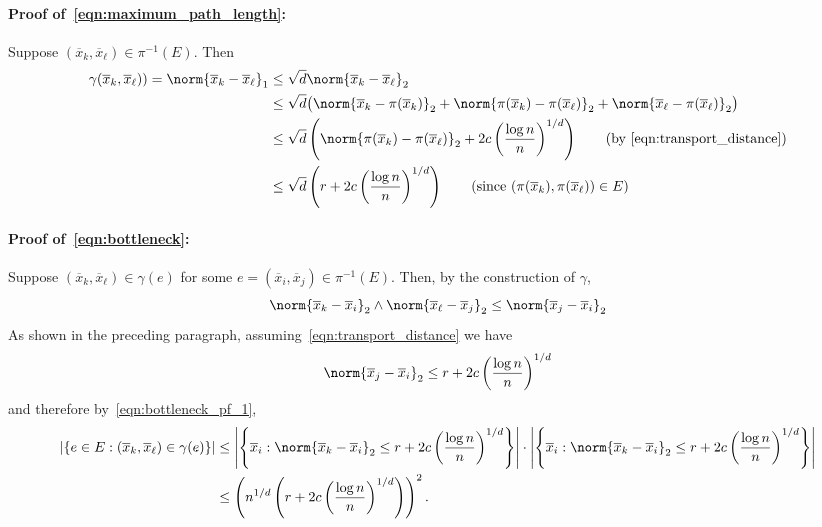 \documentclass{article}
\newcommand{\abs}[1]{\left \lvert #1 \right \rvert}
\newcommand{\set}[1]{\left\{#1\right\}}
\newcommand{\1}{\mathbf{1}}
\newcommand{\ol}[1]{\overline{#1}}
\theoremstyle{alden}
\theoremstyle{aldenthm}
\theoremstyle{definition}
\theoremstyle{remark}
\begin{document}
\paragraph{Proof of~\eqref{eqn:maximum_path_length}:}

Suppose $(\overline{x}_k, \overline{x}_{\ell}) \in \pi^{-1}(E)$. Then
\begin{align*}
\gamma(\overline{x}_k, \overline{x}_{\ell})) = \norm{\overline{x}_k - \overline{x}_{\ell}}_1 & \leq \sqrt{d} \norm{\overline{x}_k - \overline{x}_{\ell}}_2 \\
& \leq \sqrt{d}\bigl(\norm{\overline{x}_k - \pi(\ol{x}_{k})}_2 + \norm{\pi(\ol{x}_k) - \pi(\ol{x}_{\ell})}_2 + \norm{\overline{x}_\ell - \pi(\ol{x}_{\ell})}_2\bigr) \\
& \leq \sqrt{d}\left(\norm{\pi(\ol{x}_k) - \pi(\ol{x}_{\ell})}_2 + 2c\left(\frac{\log n}{n}\right)^{1/d}\right) \tag{by \eqref{eqn:transport_distance}} \\
& \leq \sqrt{d}\left(r + 2c\left(\frac{\log n}{n}\right)^{1/d}\right) \tag{since $(\pi(\ol{x}_k),\pi(\ol{x}_{\ell})) \in E$}
\end{align*} 

\paragraph{Proof of~\eqref{eqn:bottleneck}:} 

Suppose $(\overline{x}_k, \overline{x}_{\ell}) \in \gamma(e)$ for some $e = (\overline{x}_i, \overline{x}_j) \in \pi^{-1}(E)$.  Then, by the construction of $\gamma$,
\begin{equation}
\label{eqn:bottleneck_pf_1}
\norm{\overline{x}_k - \overline{x}_i}_2 \wedge \norm{\overline{x}_\ell - \overline{x}_j}_2  \leq \norm{\overline{x}_j - \overline{x}_i}_2
\end{equation}
As shown in the preceding paragraph, assuming~\eqref{eqn:transport_distance} we have
\begin{equation*}
\norm{\overline{x}_j - \overline{x}_i}_2 \leq r + 2c\left(\frac{\log n}{n}\right)^{1/d}
\end{equation*}
and therefore by~\eqref{eqn:bottleneck_pf_1},
\begin{align*}
\abs{\set{e \in E: (\overline{x}_k, \overline{x}_{\ell}) \in \gamma(e)}} & \leq \abs{\set{\overline{x}_i: \norm{\overline{x}_k - \overline{x}_i}_2 \leq r + 2c\left(\frac{\log n}{n}\right)^{1/d}}} \cdot \abs{\set{\overline{x}_i: \norm{\overline{x}_k - \overline{x}_i}_2 \leq r + 2c\left(\frac{\log n}{n}\right)^{1/d}}} \\
& \leq \left(n^{1/d}\left( r + 2c\left(\frac{\log n}{n}\right)^{1/d}\right)\right)^2.
\end{align*}
\end{document}
